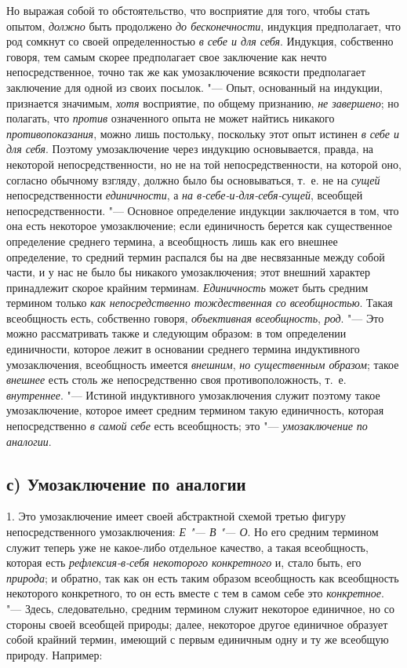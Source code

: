 Но выражая собой то обстоятельство, что восприятие для того,
чтобы стать опытом, {\em должно}
быть продолжено {\em до
бесконечности}, индукция предполагает, что род сомкнут со
своей определенностью {\em в себе и для
себя}. Индукция, собственно говоря, тем самым скорее
предполагает свое заключение как нечто непосредственное, точно так же как
умозаключение всякости предполагает заключение для одной из своих посылок.
"--- Опыт, основанный на индукции, признается значимым,
{\em хотя} восприятие, по
общему признанию, {\em не завершено};
но полагать, что
{\em против} означенного
опыта не может найтись никакого
{\em противопоказания},
можно лишь постольку, поскольку этот опыт истинен
{\em в себе и для себя}.
Поэтому умозаключение через индукцию основывается, правда, на
некоторой непосредственности, но не на той непосредственности, на которой
оно, согласно обычному взгляду, должно было бы основываться, т.~е. не на
{\em сущей}
непосредственности
{\em единичности}, а
{\em на в-себе-и-для-себя-сущей},
всеобщей непосредственности. "--- Основное
определение индукции заключается в том, что она есть некоторое
умозаключение; если единичность берется как существенное определение
среднего термина, а всеобщность лишь как его внешнее определение, то
средний термин распался бы на две несвязанные между собой части, и у нас не
было бы никакого умозаключения; этот внешний характер принадлежит скорое
крайним терминам. {\em Единичность}
может быть средним термином только
{\em как непосредственно тождественная
со всеобщностью}. Такая всеобщность есть, собственно говоря,
{\em объективная всеобщность},
{\em род}. "--- Это можно
рассматривать также и следующим образом: в том определении единичности,
которое лежит в основании среднего термина индуктивного умозаключения,
всеобщность имеется {\em внешним},
{\em но существенным образом};
такое {\em внешнее}
есть столь же непосредственно своя противоположность, т.~е.
{\em внутреннее}. "---
Истиной индуктивного умозаключения служит поэтому
такое умозаключение, которое имеет средним термином такую
единичность, которая непосредственно
{\em в самой себе} есть
всеобщность; это "--- {\em умозаключение по
аналогии}.

\subsection[с) Умозаключение по аналогии]{с) Умозаключение по аналогии}
1. Это умозаключение имеет своей абстрактной схемой третью
фигуру непосредственного умозаключения:
{\em Е "--- В
"--- О}. Но его средним термином служит теперь
уже не какое-либо отдельное качество, а такая всеобщность, которая есть
{\em рефлексия-в-себя некоторого
конкретного} и, стало быть, его
{\em природа}; и обратно,
так как он есть таким образом всеобщность как всеобщность некоторого
конкретного, то он есть вместе с тем в самом себе это
{\em конкретное}. "---
Здесь, следовательно, средним термином служит некоторое
единичное, но со стороны своей всеобщей природы; далее, некоторое другое
единичное образует собой крайний термин, имеющий с первым единичным одну и
ту же всеобщую природу. Например:


